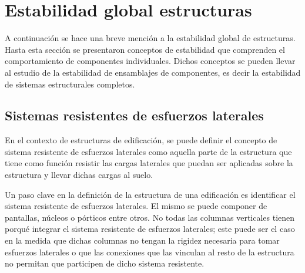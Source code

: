 


\section{Estabilidad global estructuras}
A continuación se hace una breve mención a la estabilidad global de estructuras. Hasta esta sección se presentaron conceptos de estabilidad que comprenden el comportamiento de componentes individuales. Dichos conceptos se pueden llevar al estudio de la estabilidad de ensamblajes de componentes, es decir la estabilidad de sistemas estructurales completos.

\subsection{Sistemas resistentes de esfuerzos laterales}
En el contexto de estructuras de edificación, se puede definir el concepto de sistema resistente de esfuerzos laterales como aquella parte de la estructura que tiene como función resistir las cargas laterales que puedan ser aplicadas sobre la estructura y llevar dichas cargas al suelo.

Un paso clave en la definición de la estructura de una edificación es identificar el sistema resistente de esfuerzos laterales. El mismo se puede componer de pantallas, núcleos o pórticos entre otros. No todas las columnas verticales tienen porqué integrar el sistema resistente de esfuerzos laterales; este puede ser el caso en la medida que dichas columnas no tengan la rigidez necesaria para tomar esfuerzos laterales o que las conexiones que las vinculan al resto de la estructura no permitan que participen de dicho sistema resistente.

